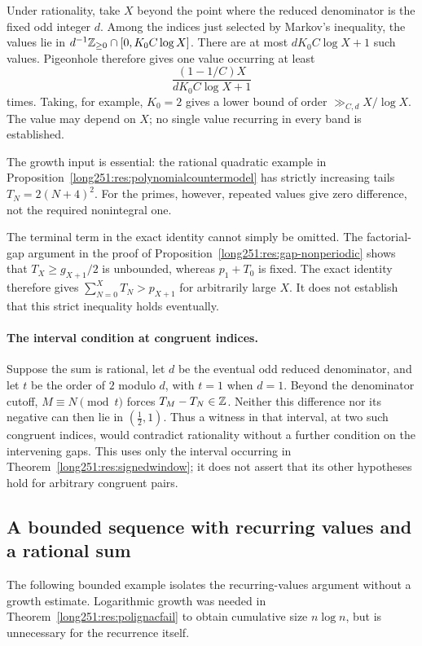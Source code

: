 \documentclass[11pt]{article}
\begin{document}
Under rationality, take $X$ beyond the point where the reduced denominator
is the fixed odd integer $d$.  Among the indices just selected by Markov's
inequality, the values lie in $d^{-1}\mathbb{Z}_{\ge0}\cap[0,K_0C\log X]$.
There are at most $dK_0C\log X+1$ such values.  Pigeonhole therefore gives
one value occurring at least
\[
 \frac{(1-1/C)X}{dK_0C\log X+1}
\]
times.  Taking, for example, $K_0=2$ gives a lower bound of order
$\gg_{C,d}X/\log X$.  The value may depend on $X$; no single value
recurring in every band is established.

The growth input is essential: the rational quadratic example in
Proposition~\ref{long251:res:polynomialcountermodel} has strictly increasing
tails $T_N=2(N+4)^2$.  For the primes, however, repeated values give
zero difference, not the required nonintegral one.

The terminal term in the exact identity cannot simply be omitted.  The factorial-gap argument in the proof of
Proposition~\ref{long251:res:gap-nonperiodic} shows that
$T_X\ge g_{X+1}/2$ is unbounded, whereas $p_1+T_0$ is fixed.
The exact identity therefore gives
$\sum_{N=0}^{X}T_N>p_{X+1}$ for arbitrarily large $X$.
It does not establish that this strict inequality holds eventually.

\paragraph{The interval condition at congruent indices.}
Suppose the sum is rational, let $d$ be the eventual odd reduced
denominator, and let $t$ be the order of $2$ modulo $d$, with $t=1$ when
$d=1$.  Beyond the denominator cutoff, $M\equiv N\pmod t$ forces
$T_M-T_N\in\mathbb{Z}$.  Neither this difference nor its negative can then lie in
$(\tfrac12,1)$.  Thus a witness in that interval, at two such congruent
indices, would contradict rationality without a further condition on
the intervening gaps.  This uses only the interval occurring in
Theorem~\ref{long251:res:signedwindow}; it does not assert that its other
hypotheses hold for arbitrary congruent pairs.

\subsection{A bounded sequence with recurring values and a rational sum}
\label{long251:sec:xr-boundedpolignac}

The following bounded example isolates the recurring-values argument
without a growth estimate.  Logarithmic growth was needed in
Theorem~\ref{long251:res:polignacfail} to obtain cumulative size
$n\log n$, but is unnecessary for the recurrence itself.
\end{document}
